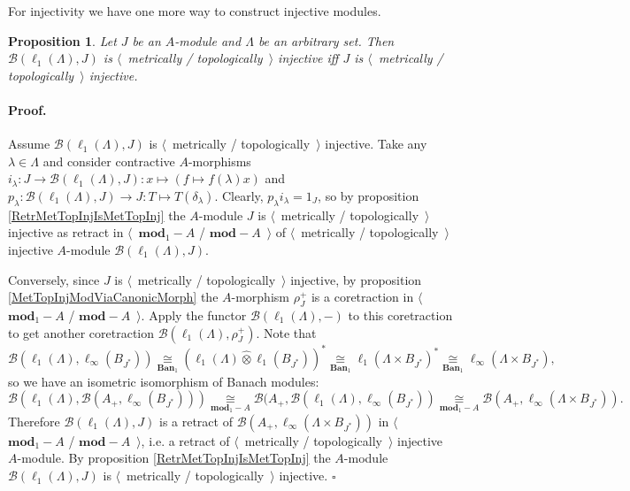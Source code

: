 \documentclass[12pt]{article}
\newcommand{\projtens}{\mathbin{\widehat{\otimes}}}
\newcommand{\isom}[1]{\mathop{\mathbin{\cong}}\limits_{#1}}
\newtheorem{proposition}[theorem]{Proposition}
\renewenvironment{proof}{\paragraph{Proof.}}{\hfill$\square$\medskip}
\begin{document}
For injectivity we have one more way to construct injective modules.

\begin{proposition}\label{MapsFroml1toMetTopInj} Let $J$ be an $A$-module and $\Lambda$ be an arbitrary set. Then $\mathcal{B}(\ell_1(\Lambda),J)$ is $\langle$~metrically / topologically~$\rangle$ injective iff $J$ is $\langle$~metrically / topologically~$\rangle$ injective.
\end{proposition}
\begin{proof} 
Assume $\mathcal{B}(\ell_1(\Lambda), J)$ is $\langle$~metrically / topologically~$\rangle$ injective. Take any $\lambda\in\Lambda$ and consider contractive $A$-morphisms $i_\lambda:J\to\mathcal{B}(\ell_1(\Lambda),J):x\mapsto(f\mapsto f(\lambda)x)$ and $p_\lambda:\mathcal{B}(\ell_1(\Lambda),J)\to J:T\mapsto T(\delta_\lambda)$. Clearly, $p_\lambda i_\lambda=1_J$, so by proposition \ref{RetrMetTopInjIsMetTopInj} the $A$-module $J$ is $\langle$~metrically / topologically~$\rangle$ injective as retract in $\langle$~$\mathbf{mod}_1-A$ / $\mathbf{mod}-A$~$\rangle$ of $\langle$~metrically / topologically~$\rangle$ injective $A$-module $\mathcal{B}(\ell_1(\Lambda),J)$.

Conversely, since $J$ is $\langle$~metrically / topologically~$\rangle$ injective, by proposition \ref{MetTopInjModViaCanonicMorph} the $A$-morphism $\rho_J^+$ is a coretraction in $\langle$~$\mathbf{mod}_1-A$ / $\mathbf{mod}-A$~$\rangle$. Apply the functor $\mathcal{B}(\ell_1(\Lambda),-)$ to this coretraction to get another coretraction $\mathcal{B}(\ell_1(\Lambda),\rho_J^+)$. Note that 
$$
\mathcal{B}(\ell_1(\Lambda),\ell_\infty(B_{J^*}))\isom{\mathbf{Ban}_1}(\ell_1(\Lambda)\projtens \ell_1(B_{J^*}))^*\isom{\mathbf{Ban}_1}\ell_1(\Lambda\times B_{J^*})^*\isom{\mathbf{Ban}_1}\ell_\infty(\Lambda\times B_{J^*}),
$$ 
so we have an isometric isomorphism of Banach modules:
$$
\mathcal{B}(\ell_1(\Lambda),\mathcal{B}(A_+,\ell_\infty(B_{J^*})))\isom{\mathbf{mod}_1-A}\mathcal{B}(A_+,\mathcal{B}(\ell_1(\Lambda),\ell_\infty(B_{J^*}))\isom{\mathbf{mod}_1-A}\mathcal{B}(A_+,\ell_\infty(\Lambda\times B_{J^*})).
$$
Therefore $\mathcal{B}(\ell_1(\Lambda),J)$ is a retract of $\mathcal{B}(A_+,\ell_\infty(\Lambda\times B_{J^*}))$ in $\langle$~$\mathbf{mod}_1-A$ / $\mathbf{mod}-A$~$\rangle$, i.e. a retract of $\langle$~metrically / topologically~$\rangle$ injective $A$-module. By proposition \ref{RetrMetTopInjIsMetTopInj} the $A$-module $\mathcal{B}(\ell_1(\Lambda), J)$ is $\langle$~metrically / topologically~$\rangle$ injective.
\end{proof}
\end{document}
